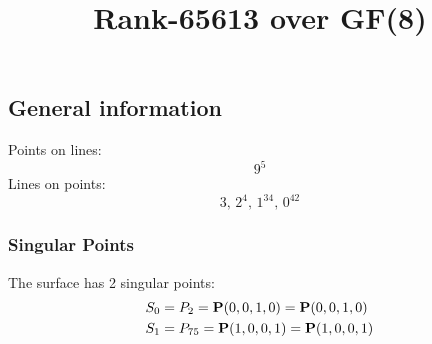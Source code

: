 \documentclass{article}
\newcommand\setTBstruts{\def\T{\rule{0pt}{2.6ex}}%
\def\B{\rule[-1.2ex]{0pt}{0pt}}}
\newcommand{\bP}{{\bf P}}
\begin{document}
 
\setTBstruts



{\allowdisplaybreaks%






\title{Rank-65613 over GF(8)}
\author{}%
\maketitle%
%
{}



\subsection*{General information}
Points on lines:
$$
9^5$$
Lines on points:
$$
3,\,2^4,\,1^{34},\,0^{42}$$
\subsubsection*{Singular Points}
The surface has 2 singular points:\\
\begin{align*}
S_{0} &= P_{2}=\bP(0, 0, 1, 0) = \bP(0, 0, 1, 0)\\
S_{1} &= P_{75}=\bP(1, 0, 0, 1) = \bP(1, 0, 0, 1)\\
\end{align*}
}
\end{document}
